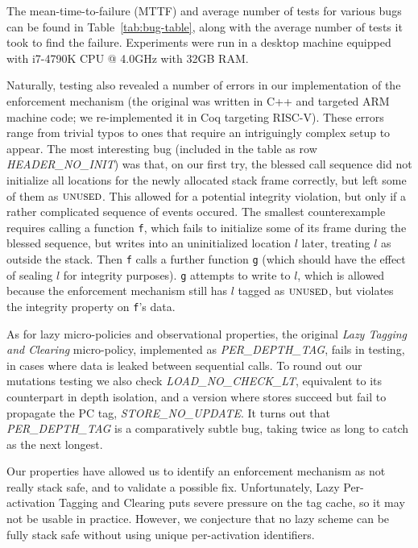 \documentclass[10pt,conference]{ieeetran}%
\theoremstyle{definition}
\begin{document}
{The mean-time-to-failure (MTTF) and average number of tests for various bugs can be found in
Table~\ref{tab:bug-table}, along with the average number of tests
it took to find the failure. Experiments were run in a desktop
machine equipped with i7-4790K CPU @ 4.0GHz with 32GB RAM.

Naturally, testing also revealed a number of errors in our
implementation of the enforcement mechanism (the original was written in C++
and targeted ARM machine code;
we re-implemented it in Coq targeting RISC-V).  These errors range
from trivial typos to ones that require an intriguingly complex setup
to appear.  The most interesting bug (included in the table as row
{\em HEADER\_NO\_INIT}) was that, on our first try, the blessed call
sequence %
did not initialize all locations for the
newly allocated stack frame correctly, but left some of them as
$\textsc{unused}$. This allowed for a potential integrity violation, but
only if a rather complicated sequence of events occured.
The smallest counterexample requires calling a function {\tt f},
which fails to initialize some of its frame during the blessed sequence,
but writes into an uninitialized location $l$ later, treating \(l\) as outside
the stack. Then {\tt f} calls a further function {\tt g} (which should have
the effect of sealing $l$ for integrity purposes). {\tt g} attempts to write to $l$,
which is allowed because the enforcement mechanism still has
$l$ tagged as $\textsc{unused}$, but violates the integrity property on {\tt f}'s data.

As for lazy micro-policies and observational properties,
the original {\em Lazy Tagging and Clearing} micro-policy, implemented as {\em PER\_DEPTH\_TAG},
fails in testing, in cases where data is leaked between sequential calls.
To round out our mutations testing we also check {\em LOAD\_NO\_CHECK\_LT},
equivalent to its counterpart in depth isolation,
and a version where stores succeed but fail to propagate the PC tag, {\em STORE\_NO\_UPDATE}.
It turns out that {\em PER\_DEPTH\_TAG} is a comparatively subtle bug,
taking twice as long to catch as the next longest.

Our properties have allowed us to identify an enforcement mechanism as
not really stack safe, and to validate a possible fix.
Unfortunately, Lazy Per-activation Tagging and Clearing
puts severe pressure on the tag cache, so it may not be usable in practice.
However, we conjecture that no lazy scheme can be fully stack safe
without using unique per-activation identifiers.

}
\end{document}
